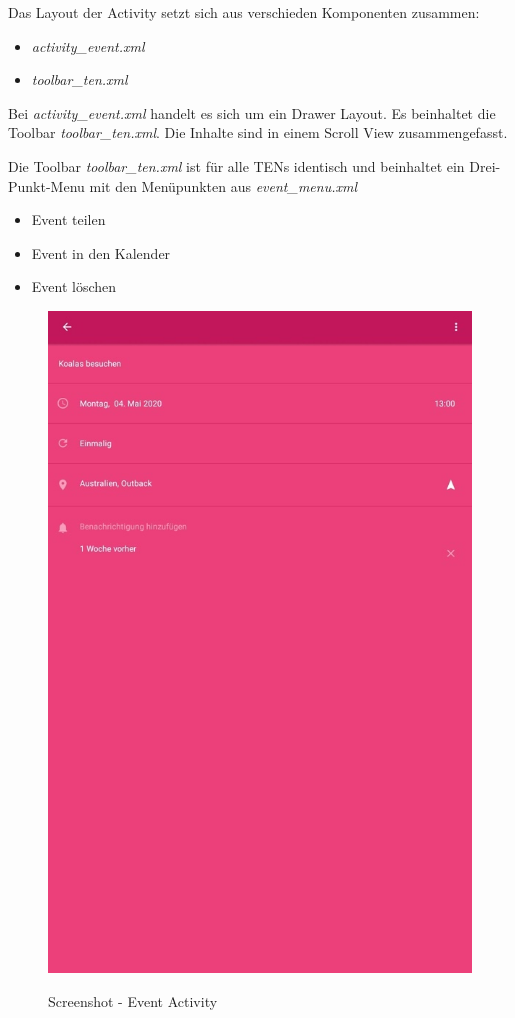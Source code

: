 Das Layout der Activity setzt sich aus verschieden Komponenten zusammen:
\begin{itemize}
\item \textit{activity\_event.xml}
\item \textit{toolbar\_ten.xml}
\end{itemize}
Bei \textit{activity\_event.xml} handelt es sich um ein Drawer Layout. Es beinhaltet die Toolbar \textit{toolbar\_ten.xml}. Die Inhalte sind in einem Scroll View zusammengefasst.

Die Toolbar \textit{toolbar\_ten.xml} ist für alle TENs identisch und beinhaltet ein Drei-Punkt-Menu mit den Menüpunkten aus \textit{event\_menu.xml}
\begin{itemize}
\item Event teilen
\item Event in den Kalender
\item Event löschen
\end{itemize}

\begin{figure}[H]
\centering
\begin{minipage}[t]{1\textwidth} %
\caption{Screenshot - Event Activity} %
\includegraphics[width=13 cm]{img/Screenshot_EventActivity.jpg}\\ %
\end{minipage}
\end{figure}

